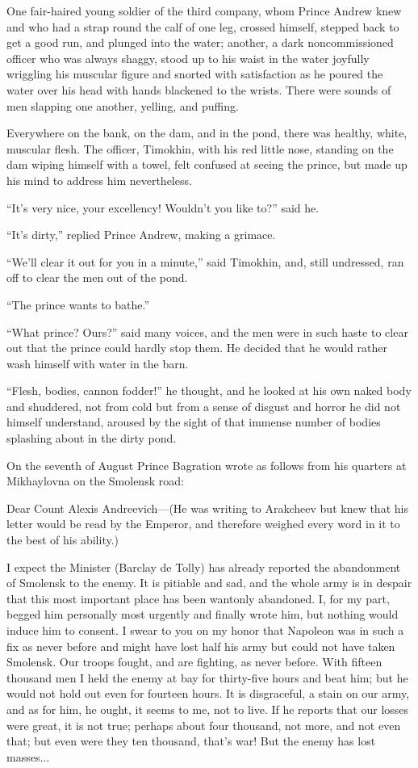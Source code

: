 One fair-haired young soldier of the third company, whom Prince
Andrew knew and who had a strap round the calf of one leg,
crossed himself, stepped back to get a good run, and plunged into
the water; another, a dark noncommissioned officer who was always
shaggy, stood up to his waist in the water joyfully wriggling his
muscular figure and snorted with satisfaction as he poured the
water over his head with hands blackened to the wrists. There
were sounds of men slapping one another, yelling, and puffing.

Everywhere on the bank, on the dam, and in the pond, there was
healthy, white, muscular flesh. The officer, Timokhin, with his
red little nose, standing on the dam wiping himself with a towel,
felt confused at seeing the prince, but made up his mind to
address him nevertheless.

``It's very nice, your excellency! Wouldn't you like to?'' said
he.

``It's dirty,'' replied Prince Andrew, making a grimace.

``We'll clear it out for you in a minute,'' said Timokhin, and,
still undressed, ran off to clear the men out of the pond.

``The prince wants to bathe.''

``What prince? Ours?'' said many voices, and the men were in such
haste to clear out that the prince could hardly stop them. He
decided that he would rather wash himself with water in the barn.

``Flesh, bodies, cannon fodder!'' he thought, and he looked at
his own naked body and shuddered, not from cold but from a sense
of disgust and horror he did not himself understand, aroused by
the sight of that immense number of bodies splashing about in the
dirty pond.

On the seventh of August Prince Bagration wrote as follows from
his quarters at Mikhaylovna on the Smolensk road:

Dear Count Alexis Andreevich---(He was writing to Arakcheev but
knew that his letter would be read by the Emperor, and therefore
weighed every word in it to the best of his ability.)

I expect the Minister (Barclay de Tolly) has already reported the
abandonment of Smolensk to the enemy. It is pitiable and sad, and
the whole army is in despair that this most important place has
been wantonly abandoned. I, for my part, begged him personally
most urgently and finally wrote him, but nothing would induce him
to consent. I swear to you on my honor that Napoleon was in such
a fix as never before and might have lost half his army but could
not have taken Smolensk. Our troops fought, and are fighting, as
never before. With fifteen thousand men I held the enemy at bay
for thirty-five hours and beat him; but he would not hold out
even for fourteen hours. It is disgraceful, a stain on our army,
and as for him, he ought, it seems to me, not to live. If he
reports that our losses were great, it is not true; perhaps about
four thousand, not more, and not even that; but even were they
ten thousand, that's war! But the enemy has lost masses...

